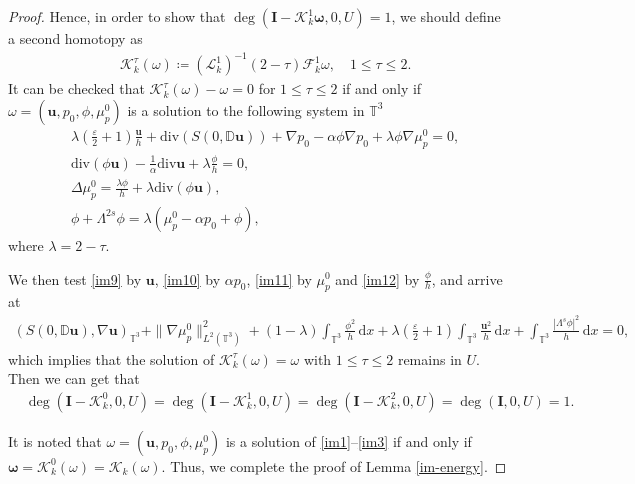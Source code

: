 \documentclass[reqno,a4paper,11pt]{amsart}
\theoremstyle{plain}
\numberwithin{equation}{section}
\begin{document}
\begin{proof}
	Hence, in order to show that $\deg(\mathbf{I}-\mathcal{K}_{k}^{1}\mathbf{\omega},0,U)=1$, we should define a second homotopy as
	\begin{align*}
		&\mathcal{K}_{k}^{\tau}(\omega)\coloneqq (\mathcal{L}_{k}^{1})^{-1}(2-\tau)\mathcal{F}_{k}^{1}\omega, \quad \text{$1\leq\tau\leq 2$.}
	\end{align*}
	It can be checked that $\mathcal{K}_{k}^{\tau}(\omega)-\omega=0$ for $1\leq\tau\leq 2$ if and only if $\omega=(\mathbf{u},p_{0},\phi,\mu_{p}^{0})$ is a solution to the following system in $\mathbb{T}^{3}$
	\begin{align}\label{im9}
		&\lambda(\frac{\varepsilon}{2}+1)\frac{\mathbf{u}}{h}
		+\mathrm{div}(S(0,\mathbb{ D}\mathbf{u}))
		+\nabla p_{0}-\alpha\phi\nabla p_{0}+\lambda\phi\nabla \mu_{p}^{0}=0,
		\\&\label{im10}\mathrm{div}(\phi\mathbf{u})- \frac{1}{\alpha}\mathrm{div}\mathbf{u} +\lambda\frac{\phi}{h}=0,
		\\&\label{im11}\Delta\mu_{p}^{0}=\frac{\lambda\phi}{h}+\lambda\mathrm{div}(\phi\mathbf{u}),
		\\&\label{im12}\phi+\Lambda^{2s}\phi=\lambda(\mu_{p}^{0}-\alpha p_{0}+\phi),
	\end{align}
	where $\lambda=2-\tau$.
	
	We then test \eqref{im9} by $\mathbf{u}$, \eqref{im10} by $\alpha p_{0}$, \eqref{im11} by $\mu_{p}^{0}$ and \eqref{im12} by $\frac{\phi}{h}$, and arrive at
	\begin{align*}
		(S(0,\mathbb{ D}\mathbf{u}),\nabla\mathbf{u})_{\mathbb{T}^{3}}+\|\nabla \mu_{p}^{0}\|_{L^{2}(\mathbb{T}^{3})}^{2}+(1-\lambda)\int_{\mathbb{T}^{3}} \frac{\phi^{2}}{h}\,\mathrm dx
		+\lambda(\frac{\varepsilon}{2}+1)\int_{\mathbb{T}^{3}} \frac{\mathbf{u}^{2}}{h}\,\mathrm dx+\int_{\mathbb{T}^{3}} \frac{|\Lambda^{s}\phi|^{2}}{h}\,\mathrm dx=0,
	\end{align*}
	which implies that  the solution of $\mathcal{K}_{k}^{\tau}(\omega)=\omega$ with $1\leq\tau\leq2$ remains in $U$. Then we can get that
	\begin{align*}
		&\deg(\mathbf{I}-\mathcal{K}_{k}^{0},0,U)=\deg(\mathbf{I}-\mathcal{K}_{k}^{1},0,U)=\deg(\mathbf{I}-\mathcal{K}_{k}^{2},0,U)=\deg(\mathbf{I},0,U)=1.
	\end{align*}
	
	It is noted that  $\omega=(\mathbf{u},p_{0},\phi, \mu_{p}^{0})$ is a solution of \eqref{im1}--\eqref{im3} if and only if $\mathbf{\omega}=\mathcal{K}_{k}^{0}(\omega)=\mathcal{K}_{k}(\omega)$.
	Thus, we complete the proof of Lemma \ref{im-energy}.
\end{proof}
\end{document}

